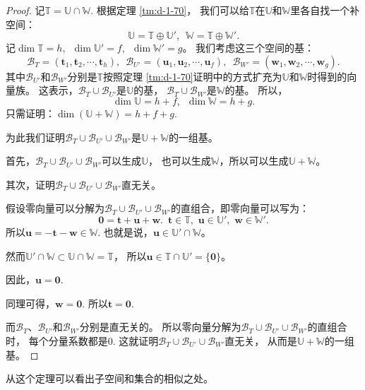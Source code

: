 \documentclass[12pt,UTF8]{ctexbook}
\begin{document}
\begin{appendix}
\begin{proof}
    记$\mathbb{T} = \mathbb{U} \cap \mathbb{W}$. 根据定理 \ref{tm:d-1-70}，
    我们可以给$\mathbb{T}$在$\mathbb{U}$和$\mathbb{W}$里各自找一个补空间：
    $$ \mathbb{U} = \mathbb{T} \oplus \mathbb{U}', \,\,\, \mathbb{W} = \mathbb{T} \oplus \mathbb{W}'.$$
    记$\dim \mathbb{T} = h, \,\,\, \dim \mathbb{U}' = f, \,\,\, \dim \mathbb{W}' = g$。
    我们考虑这三个空间的基：
    $$ \mathcal{B}_T = (\mathbf{t}_1, \mathbf{t}_2, \cdots, \mathbf{t}_h), \,\,\, \mathcal{B}_{U'} = (\mathbf{u}_1, \mathbf{u}_2, \cdots, \mathbf{u}_f), \,\,\, \mathcal{B}_{W'} = (\mathbf{w}_1, \mathbf{w}_2, \cdots, \mathbf{w}_g). $$  
    其中$\mathcal{B}_{U'}$和$\mathcal{B}_{W'}$分别是$\mathbb{T}$按照定理 
    \ref{tm:d-1-70}证明中的方式扩充为$\mathbb{U}$和$\mathbb{W}$时得到的向量族。
    这表示，$\mathcal{B}_T\cup\mathcal{B}_{U'}$是$\mathbb{U}$的基，
    $\mathcal{B}_T\cup\mathcal{B}_{W'}$是$\mathbb{W}$的基。
    所以，
    $$\dim \mathbb{U} = h + f,\,\,\,\dim \mathbb{W} = h + g.$$
    只需证明：$ \dim (\mathbb{U} + \mathbb{W}) = h + f + g.$

    为此我们证明$\mathcal{B}_T\cup\mathcal{B}_{U'}\cup\mathcal{B}_{W'}$是$\mathbb{U} + \mathbb{W}$的一组基。

    首先，$\mathcal{B}_T\cup\mathcal{B}_{U'}\cup\mathcal{B}_{W'}$可以生成$\mathbb{U}$，
    也可以生成$\mathbb{W}$，所以可以生成$\mathbb{U} + \mathbb{W}$。

    其次，证明$\mathcal{B}_T\cup\mathcal{B}_{U'}\cup\mathcal{B}_{W'}$直无关。

    假设零向量可以分解为$\mathcal{B}_T\cup\mathcal{B}_{U'}\cup\mathcal{B}_{W'}$的直组合，即零向量可以写为：
    $$ \mathbf{0} = \mathbf{t} + \mathbf{u} + \mathbf{w}. \,\,\,\mathbf{t}\in\mathbb{T},\,\,\mathbf{u}\in\mathbb{U}',\,\,\mathbf{w}\in\mathbb{W}'.$$
    所以$\mathbf{u} = -\mathbf{t} - \mathbf{w} \in \mathbb{W}$.
    也就是说，$\mathbf{u}\in \mathbb{U}'\cap\mathbb{W}$。

    然而$\mathbb{U}'\cap\mathbb{W} \subset \mathbb{U}\cap\mathbb{W} = \mathbb{T}$，
    所以$\mathbf{u}\in\mathbb{T}\cap\mathbb{U}' = \{\mathbf{0}\}$。

    因此，$\mathbf{u} = \mathbf{0}.$

    同理可得，$\mathbf{w} = \mathbf{0}.$ 所以$\mathbf{t} = \mathbf{0}.$

    而$\mathcal{B}_T$、$\mathcal{B}_{U'}$和$\mathcal{B}_{W'}$分别是直无关的。
    所以零向量分解为$\mathcal{B}_T\cup\mathcal{B}_{U'}\cup\mathcal{B}_{W'}$的直组合时，
    每个分量系数都是0. 
    这就证明$\mathcal{B}_T\cup\mathcal{B}_{U'}\cup\mathcal{B}_{W'}$直无关，
    从而是$\mathbb{U} + \mathbb{W}$的一组基。
\end{proof}

从这个定理可以看出子空间和集合的相似之处。


\end{appendix}
\end{document}
